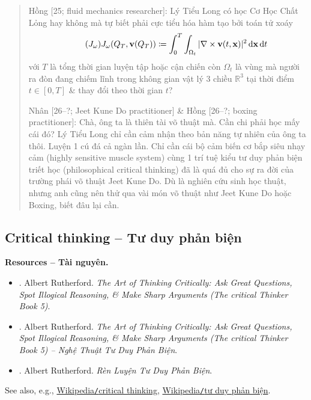 \documentclass[12pt,oneside]{book}
\begin{document}
\begin{quote}
	{\sf Hồng [25; fluid mechanics researcher]}: {\sc Lý Tiểu Long} có học Cơ Học Chất Lỏng hay không mà tự biết phải cực tiểu hóa hàm tạo bởi toán tử xoáy
	\begin{equation}
		\label{curl cost functional}
		\tag{$J_\omega$}
		J_\omega(Q_T,{\bf v}(Q_T))\coloneqq\int_0^T\int_{\Omega_t} |\nabla\times{\bf v}(t,{\bf x})|^2\,{\rm d}{\bf x}\,{\rm d}t
	\end{equation}
	với $T$ là tổng thời gian luyện tập hoặc cận chiến còn $\Omega_t$ là vùng mà người ra đòn đang chiếm lĩnh trong không gian vật lý 3 chiều $\mathbb{R}^3$ tại thời điểm $t\in[0,T]$ \& thay đổi theo thời gian $t$?
	
	{\sf Nhân [26--?; Jeet Kune Do practitioner] \& Hồng [26--?; boxing practitioner]}: Chà, ông ta là thiên tài võ thuật mà. Cần chi phải học mấy cái đó? {\sc Lý Tiểu Long} chỉ cần cảm nhận theo bản năng tự nhiên của ông ta thôi. Luyện 1 cú đá cả ngàn lần. Chỉ cần cái bộ cảm biến cơ bắp siêu nhạy cảm (highly sensitive muscle system) cùng 1 trí tuệ kiểu tư duy phản biện triết học (philosophical critical thinking) đã là quá đủ cho sự ra đời của trường phái võ thuật Jeet Kune Do. Dù là nghiên cứu sinh học thuật, nhưng anh cũng nên thử qua vài món võ thuật như Jeet Kune Do hoặc Boxing, biết đâu lại cần.
\end{quote}

\subsection{Critical thinking -- Tư duy phản biện}
\textbf{\textsf{Resources -- Tài nguyên.}}
\begin{itemize}
	\item \cite{Rutherford_critical_thinking}. {\sc Albert Rutherford}. {\it The Art of Thinking Critically: Ask Great Questions, Spot Illogical Reasoning, \& Make Sharp Arguments (The critical Thinker Book 5)}.
	\item \cite{Rutherford_critical_thinking_VN}. {\sc Albert Rutherford}. {\it The Art of Thinking Critically: Ask Great Questions, Spot Illogical Reasoning, \& Make Sharp Arguments (The critical Thinker Book 5) -- Nghệ Thuật Tư Duy Phản Biện}.
	\item \cite{Rutherford_practice_critical_thinking_VN}. {\sc Albert Rutherford}. {\it Rèn Luyện Tư Duy Phản Biện}.
\end{itemize}
See also, e.g., \href{https://en.wikipedia.org/wiki/Critical_thinking}{Wikipedia{\tt/}critical thinking}, \href{https://vi.wikipedia.org/wiki/T%C6%B0_duy_ph%E1%BA%A3n_bi%E1%BB%87n}{Wikipedia{\tt/}tư duy phản biện}.
\end{document}
